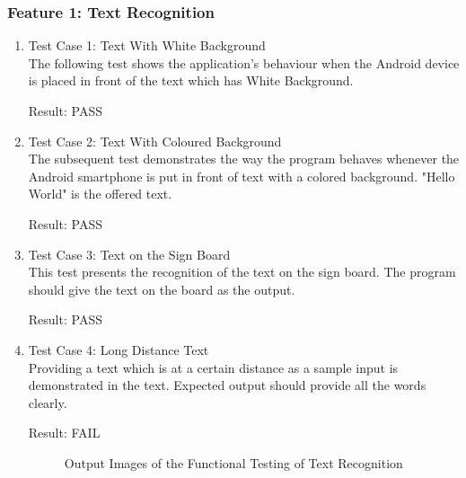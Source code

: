 \documentclass[MScCS]{uccthesis}
\begin{document}
\subsubsection{Feature 1: Text Recognition}
\begin{enumerate}
    \item Test Case 1: Text With White Background 
    \\The following test shows the application's behaviour when the Android device is placed in front of the text which has White Background. 

    Result: PASS
    \item Test Case 2: Text With Coloured Background 
    \\The subsequent test demonstrates the way the program behaves whenever the Android smartphone is put in front of text with a colored background. "Hello World" is the offered text.
   
    Result: PASS
    \item Test Case 3: Text on the Sign Board
    \\This test presents the recognition of the text on the sign board. The program should give the text on the board as the output.

    Result: PASS
    \item Test Case 4: Long Distance Text
    \\ Providing a text which is at a certain distance as a sample input is demonstrated in the text. Expected output should provide all the words clearly.

    Result: FAIL
    
      \begin{figure}[H]
    \centering
    \hfill
    \hfill
    \hfill
    \caption{Output Images of the Functional Testing of Text Recognition}
\end{figure}


\end{enumerate}
\end{document}
